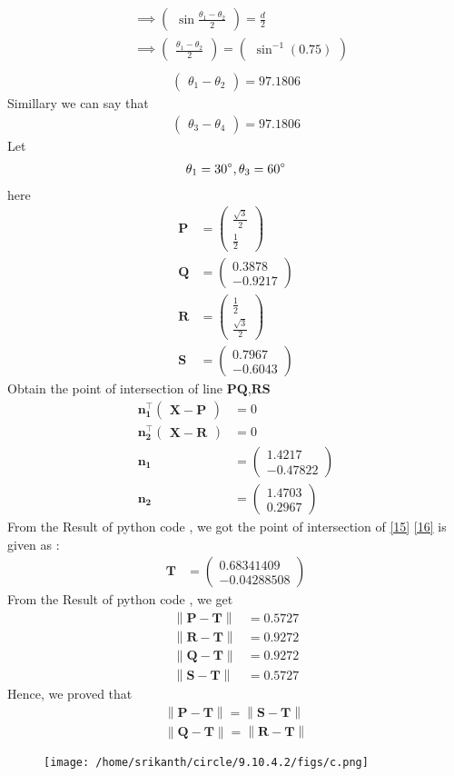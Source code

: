 \documentclass[12pt]{article}
\providecommand{\norm}[1]{\left\lVert#1\right\rVert}
\newcommand{\myvec}[1]{\ensuremath{\begin{pmatrix}#1\end{pmatrix}}}
\let\vec\mathbf
\begin{document}
\begin{enumerate}
\begin{align*}
	&\implies\myvec{\sin\frac{\theta_1-\theta_2}{2}}=\frac{d}{2}\\
&\implies\myvec{\frac{\theta_1-\theta_2}{2}}=\myvec{\sin^{-1}(0.75)}\\
	\end{align*}
\begin{align}
	\myvec{\theta_1-\theta_2}=97.1806 
	\end{align}
Simillary we can say that
\begin{align}
	\myvec{\theta_3-\theta_4}=97.1806   		       
\end{align}	
Let
\begin{align}
\theta_1=30\degree,\theta_3=60\degree
\end{align}
here
\begin{align}
\vec{P}&=\myvec{\frac{\sqrt{3}}{2}\\[2pt]\frac{1}{2}}\\
\vec{Q}&=\myvec{0.3878\\-0.9217}\\
\vec{R}&=\myvec{\frac{1}{2}\\[2pt]\frac{\sqrt{3}}{2}}\\
\vec{S}&=\myvec{0.7967\\-0.6043}
\end{align}
Obtain the point of intersection of line $\vec{PQ}$,$\vec{RS}$
\begin{align}
\vec{n_1^\top\myvec{\vec{X}-\vec{P}}}&=0\label{15}\\
\vec{n_2^\top\myvec{\vec{X}-\vec{R}}}&=0\label{16}\\
\vec{n_1}&=\myvec{1.4217\\-0.47822}\\
\vec{n_2}&=\myvec{1.4703\\0.2967}
\end{align}
From the Result of python code , we got the point of intersection of \eqref{15} \eqref{16}  is given as :
\begin{align}
\vec{T}&=\myvec{0.68341409\\-0.04288508}
\end{align}
From the Result of python code , we get
\begin{align}
\norm{\vec{P}-\vec{T}}&=0.5727\\
\norm{\vec{R}-\vec{T}}&=0.9272\\
\norm{\vec{Q}-\vec{T}}&=0.9272\\
\norm{\vec{S}-\vec{T}}&=0.5727
\end{align}
Hence, we proved that
\begin{align}
\norm{\vec{P}-\vec{T}}=\norm{\vec{S}-\vec{T}}\\
\norm{\vec{Q}-\vec{T}}=\norm{\vec{R}-\vec{T}}
\end{align} 
\begin{figure}[!h]
	\begin{center} 
	  \texttt{[image: /home/srikanth/circle/9.10.4.2/figs/c.png]}
	\end{center}
\caption{}
\label{fig:Fig1}
\end{figure}
\end{enumerate}
\end{document}
